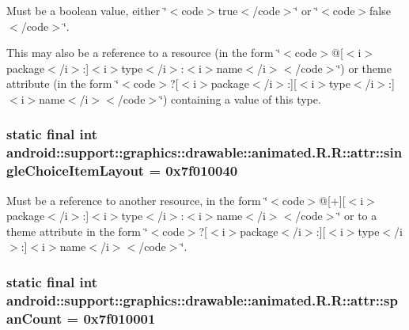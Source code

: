 Must be a boolean value, either \char`\"{}$<$code$>$true$<$/code$>$\char`\"{} or \char`\"{}$<$code$>$false$<$/code$>$\char`\"{}. 

This may also be a reference to a resource (in the form \char`\"{}$<$code$>$@\mbox{[}$<$i$>$package$<$/i$>$:\mbox{]}$<$i$>$type$<$/i$>$:$<$i$>$name$<$/i$>$$<$/code$>$\char`\"{}) or theme attribute (in the form \char`\"{}$<$code$>$?\mbox{[}$<$i$>$package$<$/i$>$:\mbox{]}\mbox{[}$<$i$>$type$<$/i$>$:\mbox{]}$<$i$>$name$<$/i$>$$<$/code$>$\char`\"{}) containing a value of this type. \hypertarget{classandroid_1_1support_1_1graphics_1_1drawable_1_1animated_1_1_r_1_1attr_cd99505e2cb862699235698aa8646a90}{
\subsubsection[{singleChoiceItemLayout}]{\setlength{\rightskip}{0pt plus 5cm}static final int android::support::graphics::drawable::animated.R.R::attr::singleChoiceItemLayout = 0x7f010040}}
\label{classandroid_1_1support_1_1graphics_1_1drawable_1_1animated_1_1_r_1_1attr_cd99505e2cb862699235698aa8646a90}


Must be a reference to another resource, in the form \char`\"{}$<$code$>$@\mbox{[}+\mbox{]}\mbox{[}$<$i$>$package$<$/i$>$:\mbox{]}$<$i$>$type$<$/i$>$:$<$i$>$name$<$/i$>$$<$/code$>$\char`\"{} or to a theme attribute in the form \char`\"{}$<$code$>$?\mbox{[}$<$i$>$package$<$/i$>$:\mbox{]}\mbox{[}$<$i$>$type$<$/i$>$:\mbox{]}$<$i$>$name$<$/i$>$$<$/code$>$\char`\"{}. \hypertarget{classandroid_1_1support_1_1graphics_1_1drawable_1_1animated_1_1_r_1_1attr_ba1972e582a3846f086ced1bb27e400f}{
\subsubsection[{spanCount}]{\setlength{\rightskip}{0pt plus 5cm}static final int android::support::graphics::drawable::animated.R.R::attr::spanCount = 0x7f010001}}
\label{classandroid_1_1support_1_1graphics_1_1drawable_1_1animated_1_1_r_1_1attr_ba1972e582a3846f086ced1bb27e400f}


